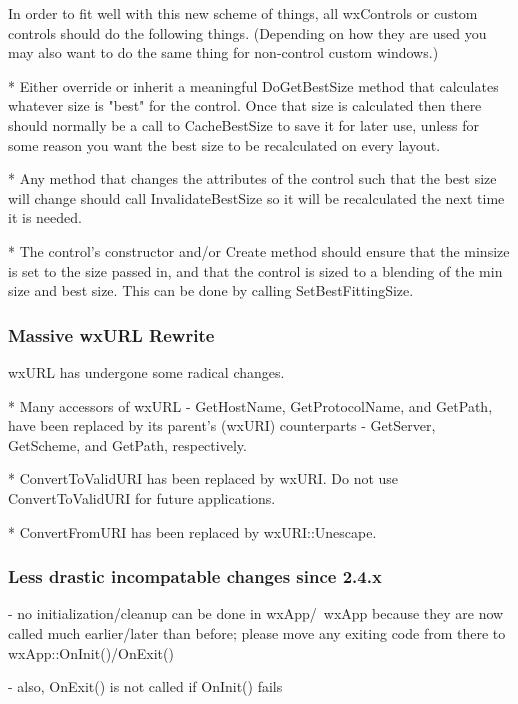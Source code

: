   In order to fit well with this new scheme of things, all wxControls
  or custom controls should do the following things.  (Depending on
  how they are used you may also want to do the same thing for
  non-control custom windows.)

    * Either override or inherit a meaningful DoGetBestSize method
      that calculates whatever size is "best" for the control.  Once
      that size is calculated then there should normally be a call to
      CacheBestSize to save it for later use, unless for some reason
      you want the best size to be recalculated on every layout.

    * Any method that changes the attributes of the control such that
      the best size will change should call InvalidateBestSize so it
      will be recalculated the next time it is needed.

    * The control's constructor and/or Create method should ensure
      that the minsize is set to the size passed in, and that the
      control is sized to a blending of the min size and best size.
      This can be done by calling SetBestFittingSize.

\subsubsection{Massive wxURL Rewrite}\label{wxurlrewrite}

wxURL has undergone some radical changes.

    * Many accessors of wxURL - GetHostName, GetProtocolName, and GetPath,
      have been replaced by its parent's (wxURI) counterparts - GetServer,
      GetScheme, and GetPath, respectively.

    * ConvertToValidURI has been replaced by wxURI.  Do not use
      ConvertToValidURI for future applications.

    * ConvertFromURI has been replaced by wxURI::Unescape.

\subsubsection{Less drastic incompatable changes since 2.4.x}\label{24incompatiblelessdrastic}

- no initialization/cleanup can be done in wxApp/~wxApp because they are
  now called much earlier/later than before; please move any exiting code
  from there to wxApp::OnInit()/OnExit()

- also, OnExit() is not called if OnInit() fails


